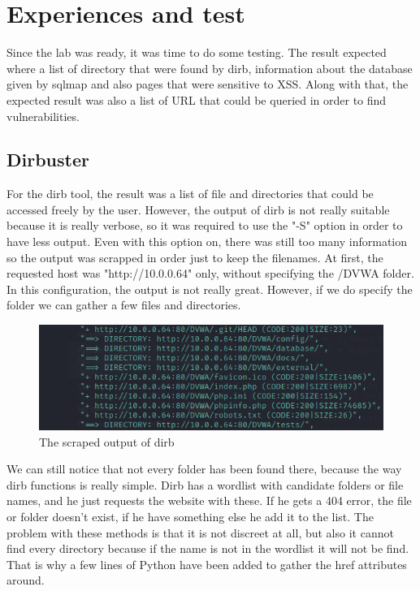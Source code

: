 \documentclass[a4paper,12pt,fleqn]{article}
\begin{document}
\section{Experiences and test}

Since the lab was ready, it was time to do some testing. The result expected where a list of directory that were found by dirb, information about the database given by sqlmap and also pages that were sensitive to XSS. Along with that, the expected result was also a list of URL that could be queried in order to find vulnerabilities.

\subsection{Dirbuster}

For the dirb tool, the result was a list of file and directories that could be accessed freely by the user. However, the output of dirb is not really suitable because it is really verbose, so it was required to use the "-S" option in order to have less output. Even with this option on, there was still too many information so the output was scrapped in order just to keep the filenames. At first, the requested host was "http://10.0.0.64" only, without specifying the /DVWA folder. In this configuration, the output is not really great. However, if we do specify the folder we can gather a few files and directories.

\begin{figure}[h]
    \centering
    \includegraphics[scale = 1]{images/dirb.png}
    \caption{The scraped output of dirb}
\end{figure}

We can still notice that not every folder has been found there, because the way dirb functions is really simple. Dirb has a wordlist with candidate folders or file names, and he just requests the website with these. If he gets a 404 error, the file or folder doesn't exist, if he have something else he add it to the list. The problem with these methods is that it is not discreet at all, but also it cannot find every directory because if the name is not in the wordlist it will not be find. That is why a few lines of Python have been added to gather the href attributes around.
\end{document}
